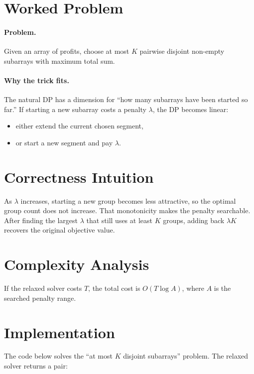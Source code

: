 \section*{Worked Problem}

\paragraph{Problem.}
Given an array of profits, choose at most \(K\) pairwise disjoint non-empty subarrays with maximum total sum.

\paragraph{Why the trick fits.}
The natural DP has a dimension for ``how many subarrays have been started so far.'' If starting a new subarray costs a
penalty \(\lambda\), the DP becomes linear:

\begin{itemize}
  \item either extend the current chosen segment,
  \item or start a new segment and pay \(\lambda\).
\end{itemize}

\section*{Correctness Intuition}

As \(\lambda\) increases, starting a new group becomes less attractive, so the optimal group count does not increase.
That monotonicity makes the penalty searchable. After finding the largest \(\lambda\) that still uses at least \(K\)
groups, adding back \(\lambda K\) recovers the original objective value.

\section*{Complexity Analysis}

If the relaxed solver costs \(T\), the total cost is \(O(T \log A)\), where \(A\) is the searched penalty range.

\section*{Implementation}

The code below solves the ``at most \(K\) disjoint subarrays'' problem. The relaxed solver returns a pair:

